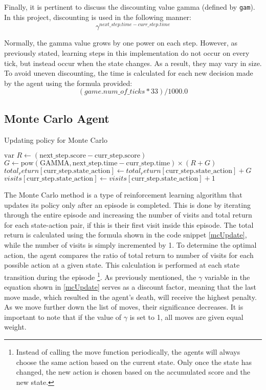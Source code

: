 Finally, it is pertinent to discuss the discounting value gamma (defined by \texttt{gam}). In this project, discounting is used in the following manner: $$\gamma^{next\_step.time - curr\_step.time}$$

Normally, the gamma value grows by one power on each step. However, as previously stated, learning steps in this implementation do not occur on every tick, but instead occur when the state changes. As a result, they may vary in size. To avoid uneven discounting, the time is calculated for each new decision made by the agent using the formula provided:  $$(game.num\_of\_ticks * 33) / 1000.0$$

\subsection{Monte Carlo Agent}

\begin{algorithm}
\caption{Updating policy for Monte Carlo}\label{mcUpdate}
\begin{algorithmic}[1]
\State $\text{var } R \gets (\text{next_step.score} - \text{curr_step.score})$
\State $G \gets \text{pow}(\text{GAMMA},\text{next_step.time} - \text{curr_step.time}) \times (R + G)$
\State $total_return[\text{curr_step.state_action}] \gets total_return[\text{curr_step.state_action}] + G$
\State $visits[\text{curr_step.state_action}] \gets visits[\text{curr_step.state_action}] + 1$
\EndIf
\end{algorithmic}
\end{algorithm}

The Monte Carlo method is a type of reinforcement learning algorithm that updates its policy only after an episode is completed. This is done by iterating through the entire episode and increasing the number of visits and total return for each state-action pair, if this is their first visit inside this episode. The total return is calculated using the formula shown in the code snippet \ref{mcUpdate}, while the number of visits is simply incremented by 1. To determine the optimal action, the agent compares the ratio of total return to number of visits for each possible action at a given state. This calculation is performed at each state transition during the episode \footnote{Instead of calling the move function periodically, the agents will always choose the same action based on the current state. Only once the state has changed, the new action is chosen based on the accumulated score and the new state.}.
As previously mentioned, the $\gamma$ variable in the equation shown in \ref{mcUpdate} serves as a discount factor, meaning that the last move made, which resulted in the agent's death, will receive the highest penalty. As we move further down the list of moves, their significance decreases. It is important to note that if the value of $\gamma$ is set to 1, all moves are given equal weight. 

